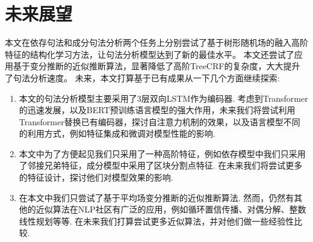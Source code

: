 \section{未来展望}
本文在依存句法和成分句法分析两个任务上分别尝试了基于树形随机场的融入高阶特征的结构化学习方法，让句法分析模型达到了新的最佳水平。
本文还尝试了应用基于变分推断的近似推断算法，显著降低了高阶TreeCRF的复杂度，大大提升了句法分析速度。
未来，本文打算基于已有成果从一下几个方面继续探索:
\begin{enumerate}
	\item 本文的句法分析模型主要采用了3层双向LSTM作为编码器.
	      考虑到Transformer的迅速发展，以及BERT预训练语言模型的强大作用，未来我们将尝试利用Transformer替换已有编码器，探讨自注意力机制的效果，以及语言模型不同的利用方式，例如特征集成和微调对模型性能的影响.
	\item 本文中为了方便起见我们只采用了一种高阶特征，例如依存模型中我们只采用了邻接兄弟特征，成分模型中采用了区块分割点特征.
	      在未来我们将尝试更多的特征设计，探讨他们对模型效果的影响.
	\item 在本文中我们只尝试了基于平均场变分推断的近似推断算法.
	      然而，仍然有其他的近似算法在NLP社区有广泛的应用，例如循环置信传播、对偶分解、整数线性规划等等.
	      在未来我们打算尝试更多近似算法，并对他们做一些经验性比较.
\end{enumerate}
